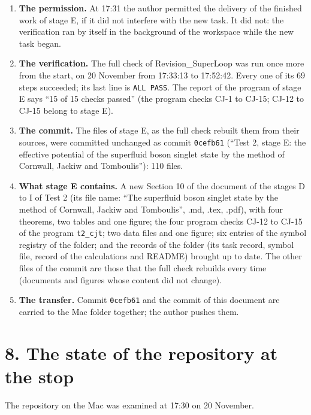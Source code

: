 \documentclass[
  10pt,
]{article}
\providecommand{\tightlist}{%
  \setlength{\itemsep}{0pt}\setlength{\parskip}{0pt}}
\begin{document}
\begin{enumerate}
\def\labelenumi{\arabic{enumi}.}
\tightlist
\item
  \textbf{The permission.} At 17:31 the author permitted the delivery of
  the finished work of stage E, if it did not interfere with the new
  task. It did not: the verification ran by itself in the background of
  the workspace while the new task began.
\item
  \textbf{The verification.} The full check of Revision\_SuperLoop was
  run once more from the start, on 20 November from 17:33:13 to
  17:52:42. Every one of its 69 steps succeeded; its last line is
  \texttt{ALL\ PASS}. The report of the program of stage E says ``15 of
  15 checks passed'' (the program checks CJ-1 to CJ-15; CJ-12 to CJ-15
  belong to stage E).
\item
  \textbf{The commit.} The files of stage E, as the full check rebuilt
  them from their sources, were committed unchanged as commit
  \texttt{0cefb61} (``Test 2, stage E: the effective potential of the
  superfluid boson singlet state by the method of Cornwall, Jackiw and
  Tomboulis''): 110 files.
\item
  \textbf{What stage E contains.} A new Section 10 of the document of
  the stages D to I of Test 2 (its file name: ``The superfluid boson
  singlet state by the method of Cornwall, Jackiw and Tomboulis'', .md,
  .tex, .pdf), with four theorems, two tables and one figure; the four
  program checks CJ-12 to CJ-15 of the program \texttt{t2\_cjt}; two
  data files and one figure; six entries of the symbol registry of the
  folder; and the records of the folder (its task record, symbol file,
  record of the calculations and README) brought up to date. The other
  files of the commit are those that the full check rebuilds every time
  (documents and figures whose content did not change).
\item
  \textbf{The transfer.} Commit \texttt{0cefb61} and the commit of this
  document are carried to the Mac folder together; the author pushes
  them.
\end{enumerate}

\hypertarget{the-state-of-the-repository-at-the-stop}{%
\section{8. The state of the repository at the
stop}\label{the-state-of-the-repository-at-the-stop}}

The repository on the Mac was examined at 17:30 on 20 November.
\end{document}
